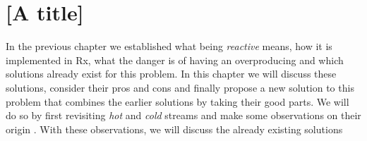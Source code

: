 \chapter{[A title]}

In the previous chapter we established what being \textit{reactive} means, how it is implemented in Rx, what the danger is of having an overproducing \obs and which solutions already exist for this problem. In this chapter we will discuss these solutions, consider their pros and cons and finally propose a new solution to this problem that combines the earlier solutions by taking their good parts. We will do so by first revisiting \textit{hot} and \textit{cold} streams and make some observations on their origin . With these observations, we will discuss the already existing solutions 



